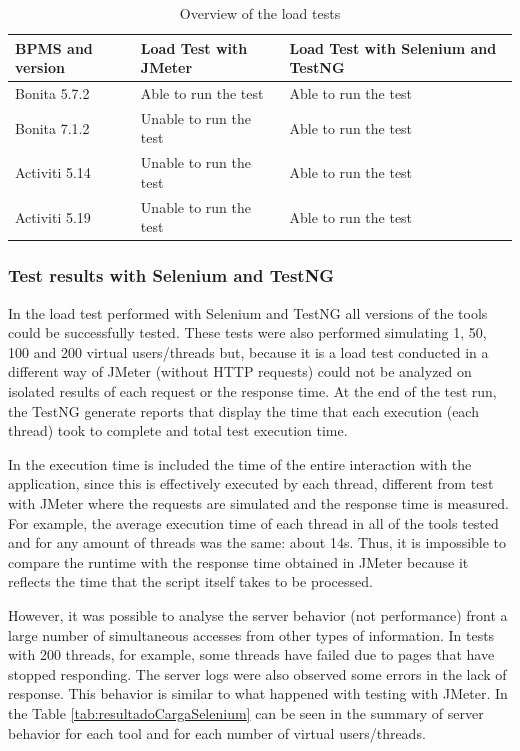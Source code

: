 \documentclass[runningheads,a4paper]{llncs}
\begin{document}
\begin{table}
\centering
\begin{tabular}{p{3cm}|p{3cm}|p{3cm}}
\hline
BPMS and version & Load Test with JMeter & Load Test with Selenium and TestNG \\\hline
Bonita 5.7.2 & Able to run the test & Able to run the test \\\hline
Bonita 7.1.2 & Unable to run the test & Able to run the test \\\hline
Activiti 5.14 & Unable to run the test & Able to run the test \\\hline
Activiti 5.19 & Unable to run the test & Able to run the test \\\hline
\end{tabular}
\caption{Overview of the load tests}
\label{tab:foiPossivelCarga}
\end{table}

\subsubsection{Test results with Selenium and TestNG}
In the load test performed with Selenium and TestNG all versions of the tools could be successfully tested. These tests were also performed simulating 1, 50, 100 and 200 virtual users/threads but, because it is a load test conducted in a different way of JMeter (without HTTP requests) could not be analyzed on isolated results of each request or the response time. At the end of the test run, the TestNG generate reports that display the time that each execution (each thread) took to complete and total test execution time. 

In the execution time is included the time of the entire interaction with the application, since this is effectively executed by each thread, different from test with JMeter where the requests are simulated and the response time is measured. For example, the average execution time of each thread in all of the tools tested and for any amount of threads was the same: about 14s. Thus, it is impossible to compare the runtime with the response time obtained in JMeter because it reflects the time that the script itself takes to be processed.

However, it was possible to analyse the server behavior (not performance) front a large number of simultaneous accesses from other types of information. In tests with 200 threads, for example, some threads have failed due to pages that have stopped responding. The server logs were also observed some errors in the lack of response. This behavior is similar to what happened with testing with JMeter. In the Table \ref{tab:resultadoCargaSelenium} can be seen in the summary of server behavior for each tool and for each number of virtual users/threads.
\end{document}
